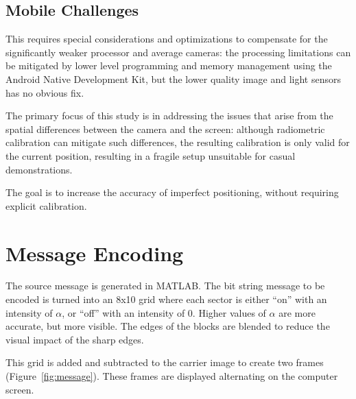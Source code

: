 \documentclass[11pt, letterpaper]{article}
\begin{document}
\subsection{Mobile Challenges}

This requires special considerations and optimizations to compensate for the significantly weaker processor and average cameras: the processing limitations can be mitigated by lower level programming and memory management using the Android Native Development Kit, but the lower quality image and light sensors has no obvious fix.

The primary focus of this study is in addressing the issues that arise from the spatial differences between the camera and the screen: although radiometric calibration can mitigate such differences, the resulting calibration is only valid for the current position, resulting in a fragile setup unsuitable for casual demonstrations.

The goal is to increase the accuracy of imperfect positioning, without requiring explicit calibration.

\section{Message Encoding}
The source message is generated in MATLAB. The bit string message to be encoded is turned into an 8x10 grid where each sector is either ``on'' with an intensity of $\alpha$, or ``off'' with an intensity of $0$.
Higher values of $\alpha$ are more accurate, but more visible.
The edges of the blocks are blended to reduce the visual impact of the sharp edges.

This grid is added and subtracted to the carrier image to create two frames (Figure~\ref{fig:message}). These frames are displayed alternating on the computer screen.
\end{document}
